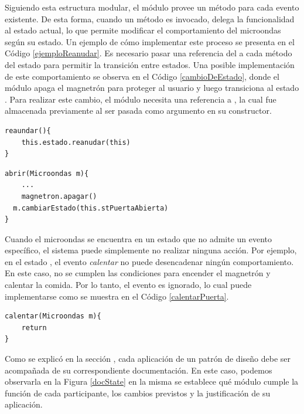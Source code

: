 Siguiendo esta estructura modular, el módulo \Microondas provee un método para cada evento existente. De esta forma, cuando un método es invocado, delega la funcionalidad al estado actual, lo que permite modificar el comportamiento del microondas según su estado. Un ejemplo de cómo implementar este proceso se presenta en el Código \ref{ejemploReanudar}. Es necesario pasar una referencia del \Microondas a cada método del estado para permitir la transición entre estados. Una posible implementación de este comportamiento se observa en el Código \ref{cambioDeEstado}, donde el módulo \Calentando apaga el magnetrón para proteger al usuario y luego transiciona al estado \PuertaAbierta. Para realizar este cambio, el módulo \Calentando necesita una referencia a \PuertaAbierta, la cual fue almacenada previamente al ser pasada como argumento en su constructor.

\begin{lstlisting}[caption=Ejemplo de implementación método reaundar del módulo Microondas, label=ejemploReanudar]
reaundar(){
    this.estado.reanudar(this)
}
\end{lstlisting}
\begin{lstlisting}[caption=Ejemplo de implementación método abrir del módulo Calentando, label=cambioDeEstado]
abrir(Microondas m){
	...
	magnetron.apagar()
  m.cambiarEstado(this.stPuertaAbierta)
}
\end{lstlisting}

Cuando el microondas se encuentra en un estado que no admite un evento específico, el sistema puede simplemente no realizar ninguna acción. Por ejemplo, en el estado \PuertaAbierta, el evento \textit{calentar} no puede desencadenar ningún comportamiento. En este caso, no se cumplen las condiciones para encender el magnetrón y calentar la comida. Por lo tanto, el evento es ignorado, lo cual puede implementarse como se muestra en el Código \ref{calentarPuerta}.
\begin{lstlisting}[caption=Ejemplo de implementación método calentar del módulo PuertaAbierta, label=calentarPuerta]
calentar(Microondas m){
	return
}
\end{lstlisting}

Como se explicó en la sección , cada aplicación de un patrón de diseño debe ser acompañada de su correspondiente documentación. En este caso, podemos observarla en la Figura \ref{docState} en la misma se establece qué módulo cumple la función de cada participante, los cambios previstos y la justificación de su aplicación.

